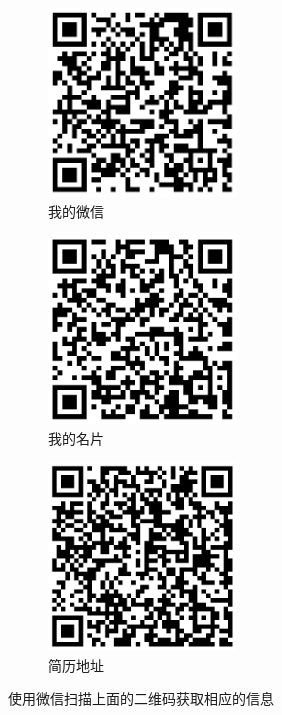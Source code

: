 \graphicspath{ {../} }

\begin{figure}[h]
  \begin{subfigure}{0.33\textwidth}
    \includegraphics[width=0.9\linewidth, height=5cm]{weixin} 
    \caption{我的微信}
    \label{fig:subim1}
  \end{subfigure}
  \begin{subfigure}{0.33\textwidth}
    \includegraphics[width=0.9\linewidth, height=5cm]{vcard}
    \caption{我的名片}
    \label{fig:subim2}
  \end{subfigure}
  \begin{subfigure}{0.33\textwidth}
    \includegraphics[width=0.9\linewidth, height=5cm]{resume-url}
    \caption{简历地址}
    \label{fig:subim3}
  \end{subfigure}
  
  \caption{使用微信扫描上面的二维码获取相应的信息}
  \label{fig:image1}
\end{figure}